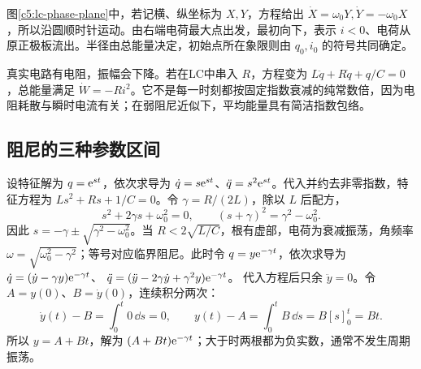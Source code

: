 图\ref{c5:lc-phase-plane}中，若记横、纵坐标为 $X,Y$，方程给出 $\dot X=\omega_0Y,\dot Y=-\omega_0X$，所以沿圆顺时针运动。由右端电荷最大点出发，最初向下，表示 $i<0$、电荷从原正极板流出。半径由总能量决定，初始点所在象限则由 $q_0,i_0$ 的符号共同确定。

真实电路有电阻，振幅会下降。若在LC中串入 $R$，方程变为 $L\ddot q+R\dot q+q/C=0$，总能量满足 $\dot W=-Ri^2$。它不是每一时刻都按固定指数衰减的纯常数倍，因为电阻耗散与瞬时电流有关；在弱阻尼近似下，平均能量具有简洁指数包络。

\subsection{阻尼的三种参数区间}

设特征解为 $q=\mathrm e^{st}$，依次求导为 $\dot q=s\mathrm e^{st}$、$\ddot q=s^2\mathrm e^{st}$。代入并约去非零指数，特征方程为 $Ls^2+Rs+1/C=0$。令 $\gamma=R/(2L)$，除以 $L$ 后配方，
\[
 s^2+2\gamma s+\omega_0^2=0,\qquad
 (s+\gamma)^2=\gamma^2-\omega_0^2.
\]
因此 $s=-\gamma\pm\sqrt{\gamma^2-\omega_0^2}$。当 $R<2\sqrt{L/C}$，根有虚部，电荷为衰减振荡，角频率 $\omega=\sqrt{\omega_0^2-\gamma^2}$；等号对应临界阻尼。此时令 $q=y\mathrm e^{-\gamma t}$，依次求导为
$\dot q=(\dot y-\gamma y)\mathrm e^{-\gamma t}$、
$\ddot q=(\ddot y-2\gamma\dot y+\gamma^2y)\mathrm e^{-\gamma t}$。
代入方程后只余 $\ddot y=0$。令 $A=y(0)$、$B=\dot y(0)$，连续积分两次：
\[
 \dot y(t)-B=\int_0^t0\,\dd s=0,\qquad
 y(t)-A=\int_0^t B\,\dd s=B[s]_0^t=Bt.
\]
所以 $y=A+Bt$，解为 $(A+Bt)\mathrm e^{-\gamma t}$；大于时两根都为负实数，通常不发生周期振荡。

